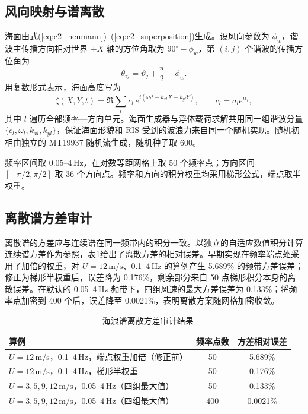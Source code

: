 \subsection{风向映射与谱离散}

海面由式(\ref{eq:c2_neumann})--(\ref{eq:c2_superposition})生成。设风向参数为 $\phi_w$，谐波主传播方向相对世界 $+X$ 轴的方位角取为 $90^\circ-\phi_w$，第 $(i,j)$ 个谐波的传播方位角为
\begin{equation}
\theta_{ij}=\vartheta_j+\frac{\pi}{2}-\phi_w.
\label{eq:c3_wind}
\end{equation}
用复数形式表示，海面高度写为
\begin{equation}
\zeta(X,Y,t)=\Re\sum_{l}c_l\,e^{i(\omega_lt-k_{xl}X-k_{yl}Y)},\qquad c_l=a_le^{i\epsilon_l},
\label{eq:c3_complex}
\end{equation}
其中 $l$ 遍历全部频率—方向单元。海面生成器与浮体载荷求解共用同一组谐波分量 $\{c_l,\omega_l,k_{xl},k_{yl}\}$，保证海面形貌和 RIS 受到的波浪力来自同一个随机实现。随机初相由独立的 MT19937 随机流生成，随机种子取 600。

频率区间取 0.05--4\,Hz，在对数等距网格上取 50 个频率点；方向区间 $[-\pi/2,\pi/2]$ 取 36 个方向点。频率和方向的积分权重均采用梯形公式，端点取半权重。


\subsection{离散谱方差审计}

离散谱的方差应与连续谱在同一频带内的积分一致。以独立的自适应数值积分计算连续谱方差作为参照，表\ref{tab:c3_audit}给出了离散方差的相对误差。早期实现在频率端点处采用了加倍的权重，对 $U=12\,\mathrm{m/s}$、0.1--4\,Hz 的算例产生 5.689\% 的频带方差误差；修正为梯形半权重后，误差降为 0.176\%，剩余部分来自 50 点梯形积分本身的离散误差。在默认的 0.05--4\,Hz 频带下，四组风速的最大方差误差为 0.133\%；将频率点加密到 400 个后，误差降至 0.0021\%，表明离散方案随网格加密收敛。

\begin{table}[htbp]
\caption{海浪谱离散方差审计结果}
\label{tab:c3_audit}
\centering
\begin{tabular}{lcc}
\toprule
算例 & 频率点数 & 方差相对误差 \\
\midrule
$U=12\,\mathrm{m/s}$，0.1--4\,Hz，端点权重加倍（修正前） & 50 & 5.689\% \\
$U=12\,\mathrm{m/s}$，0.1--4\,Hz，梯形半权重 & 50 & 0.176\% \\
$U=3,5,9,12\,\mathrm{m/s}$，0.05--4\,Hz（四组最大值） & 50 & 0.133\% \\
$U=3,5,9,12\,\mathrm{m/s}$，0.05--4\,Hz（四组最大值） & 400 & 0.0021\% \\
\bottomrule
\end{tabular}
\end{table}

